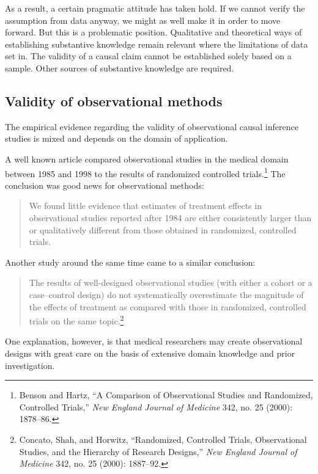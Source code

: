 \documentclass{tufte-book}
\begin{document}
As a result, a certain pragmatic attitude has taken hold. If we cannot
verify the assumption from data anyway, we might as well make it in
order to move forward. But this is a problematic position. Qualitative
and theoretical ways of establishing substantive knowledge remain
relevant where the limitations of data set in. The validity of a causal
claim cannot be established solely based on a sample. Other sources of
substantive knowledge are required.

\hypertarget{validity-of-observational-methods}{%
\subsection{Validity of observational
methods}\label{validity-of-observational-methods}}

The empirical evidence regarding the validity of observational causal
inference studies is mixed and depends on the domain of application.

A well known article compared observational studies in the medical
domain between 1985 and 1998 to the results of randomized controlled
trials.\footnote{Benson and Hartz, {``A Comparison of Observational
  Studies and Randomized, Controlled Trials,''} \emph{New England
  Journal of Medicine} 342, no. 25 (2000): 1878--86.} The conclusion was
good news for observational methods:

\begin{quote}
We found little evidence that estimates of treatment effects in
observational studies reported after 1984 are either consistently larger
than or qualitatively different from those obtained in randomized,
controlled trials.
\end{quote}

Another study around the same time came to a similar conclusion:

\begin{quote}
The results of well-designed observational studies (with either a cohort
or a case--control design) do not systematically overestimate the
magnitude of the effects of treatment as compared with those in
randomized, controlled trials on the same topic.\footnote{Concato, Shah,
  and Horwitz, {``Randomized, Controlled Trials, Observational Studies,
  and the Hierarchy of Research Designs,''} \emph{New England Journal of
  Medicine} 342, no. 25 (2000): 1887--92.}
\end{quote}

One explanation, however, is that medical researchers may create
observational designs with great care on the basis of extensive domain
knowledge and prior investigation.
\end{document}
